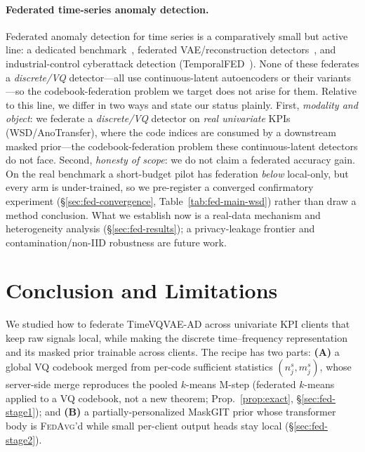 \documentclass[11pt]{article}
\theoremstyle{plain}
\theoremstyle{definition}
\begin{document}
\paragraph{Federated time-series anomaly detection.}
Federated anomaly detection for time series is a comparatively small but active line:
a dedicated benchmark~\cite{liu2022fedtadbench}, federated VAE/reconstruction
detectors~\cite{zhang2021fedanomaly,zhu2022deepfedad}, and industrial-control
cyberattack detection (TemporalFED~\cite{perales2023temporalfed}). None of these
federates a \emph{discrete/VQ} detector---all use continuous-latent autoencoders or
their variants---so the codebook-federation problem we target does not arise for them.
Relative to this line, we differ in two ways and state our status plainly. First,
\emph{modality and object}: we federate a \emph{discrete/VQ} detector on \emph{real
univariate} KPIs (WSD/AnoTransfer), where the code indices are consumed by a downstream
masked prior---the codebook-federation problem these continuous-latent detectors do not
face. Second, \emph{honesty of scope}: we do not claim a federated accuracy gain. On the
real benchmark a short-budget pilot has federation \emph{below} local-only, but every arm
is under-trained, so we pre-register a converged confirmatory experiment
(\S\ref{sec:fed-convergence}, Table~\ref{tab:fed-main-wsd}) rather than draw a method
conclusion. What we establish now is a real-data mechanism and heterogeneity analysis
(\S\ref{sec:fed-results}); a privacy-leakage frontier and contamination/non-IID robustness
are future work.



\section{Conclusion and Limitations}
\label{sec:fed-conclusion}

We studied how to federate TimeVQVAE-AD across univariate KPI clients that keep raw
signals local, while making the discrete time--frequency representation and its masked
prior trainable across clients. The recipe has two parts: \textbf{(A)} a global VQ
codebook merged from per-code sufficient statistics $(n^{s}_{j}, m^{s}_{j})$, whose
server-side merge reproduces the pooled $k$-means M-step (federated $k$-means applied to a
VQ codebook, not a new theorem; Prop.~\ref{prop:exact}, \S\ref{sec:fed-stage1}); and
\textbf{(B)} a partially-personalized MaskGIT prior whose transformer body is
\textsc{FedAvg}'d while small per-client output heads stay local (\S\ref{sec:fed-stage2}).
\end{document}
